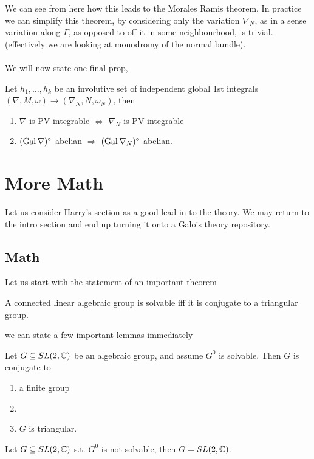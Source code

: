 \documentclass{article}
\begin{document}
We can see from here how this leads to the Morales Ramis theorem. In practice we can simplify this theorem, by considering only the  variation $\nabla_N$, as in a sense variation along $\Gamma$, as opposed to off it in some neighbourhood, is trivial. (effectively we are looking at monodromy of the normal bundle). \\
\\
We will now state one final prop,
\begin{prop}
Let $h_1, \dots, h_k$ be an involutive set of independent global 1st integrals $(\nabla,M,\omega) \to (\nabla_N,N,\omega_N)$, then 
\begin{enumerate}
    \item $\nabla$ is PV integrable $\Leftrightarrow$ $\nabla_N$ is PV integrable
    \item $(\operatorname{Gal}\nabla)^\circ$ abelian $\Rightarrow$ $(\operatorname{Gal}\nabla_N)^\circ$ abelian. 
\end{enumerate}
\end{prop}
\section{More Math}
Let us consider Harry's section as a good lead in to the theory. We may return to the intro section and end up turning it onto a Galois theory repository. 
\subsection{Math}
Let us start with the statement of an important theorem 

\begin{theorem}
A connected linear algebraic group is solvable iff it is conjugate to a triangular group.
\end{theorem}

we can state a few important lemmas immediately

\begin{lemma}
Let $G\subseteq SL(2,\mathbb{C})$ be an algebraic group, and assume $G^0$ is solvable. Then $G$ is conjugate to 
\begin{enumerate}
    \item a finite group 
    \item {} \\
    \item $G$ is triangular. 
\end{enumerate}
\end{lemma}

\begin{lemma}
Let $G\subseteq SL(2,\mathbb{C})$ s.t. $G^0$ is not solvable, then $G= SL(2,\mathbb{C})$. 
\end{lemma}


\end{document}
